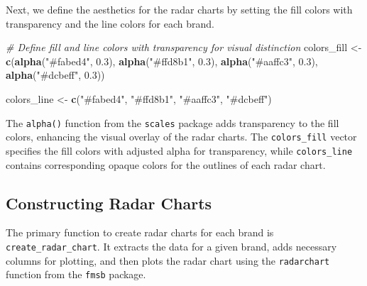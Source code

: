 \documentclass[
]{book}
\newenvironment{Shaded}{\begin{snugshade}}{\end{snugshade}}
\newcommand{\CommentTok}[1]{\textcolor[rgb]{0.56,0.35,0.01}{\textit{#1}}}
\newcommand{\FloatTok}[1]{\textcolor[rgb]{0.00,0.00,0.81}{#1}}
\newcommand{\FunctionTok}[1]{\textcolor[rgb]{0.13,0.29,0.53}{\textbf{#1}}}
\newcommand{\NormalTok}[1]{#1}
\newcommand{\OtherTok}[1]{\textcolor[rgb]{0.56,0.35,0.01}{#1}}
\newcommand{\StringTok}[1]{\textcolor[rgb]{0.31,0.60,0.02}{#1}}
\begin{document}
Next, we define the aesthetics for the radar charts by setting the fill colors with transparency and the line colors for each brand.

\begin{Shaded}
\begin{Highlighting}[]
\CommentTok{\# Define fill and line colors with transparency for visual distinction}
\NormalTok{colors\_fill }\OtherTok{\textless{}{-}} \FunctionTok{c}\NormalTok{(}\FunctionTok{alpha}\NormalTok{(}\StringTok{"\#fabed4"}\NormalTok{, }\FloatTok{0.3}\NormalTok{),}
                 \FunctionTok{alpha}\NormalTok{(}\StringTok{"\#ffd8b1"}\NormalTok{, }\FloatTok{0.3}\NormalTok{),}
                 \FunctionTok{alpha}\NormalTok{(}\StringTok{"\#aaffc3"}\NormalTok{, }\FloatTok{0.3}\NormalTok{),}
                 \FunctionTok{alpha}\NormalTok{(}\StringTok{"\#dcbeff"}\NormalTok{, }\FloatTok{0.3}\NormalTok{))}

\NormalTok{colors\_line }\OtherTok{\textless{}{-}} \FunctionTok{c}\NormalTok{(}\StringTok{"\#fabed4"}\NormalTok{, }\StringTok{"\#ffd8b1"}\NormalTok{, }\StringTok{"\#aaffc3"}\NormalTok{, }\StringTok{"\#dcbeff"}\NormalTok{)}
\end{Highlighting}
\end{Shaded}

The \texttt{alpha()} function from the \texttt{scales} package adds transparency to the fill colors, enhancing the visual overlay of the radar charts. The \texttt{colors\_fill} vector specifies the fill colors with adjusted alpha for transparency, while \texttt{colors\_line} contains corresponding opaque colors for the outlines of each radar chart.

\hypertarget{constructing-radar-charts}{%
\subsection*{Constructing Radar Charts}\label{constructing-radar-charts}}

The primary function to create radar charts for each brand is \texttt{create\_radar\_chart}. It extracts the data for a given brand, adds necessary columns for plotting, and then plots the radar chart using the \texttt{radarchart} function from the \texttt{fmsb} package.
\end{document}
